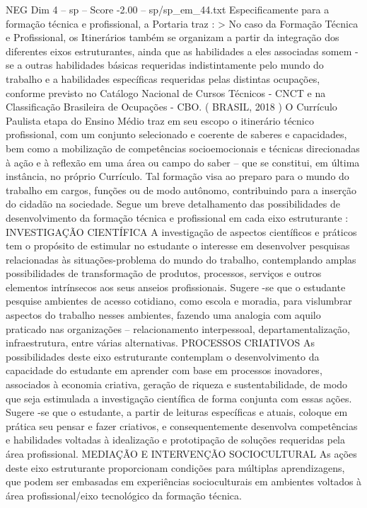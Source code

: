 \begin{textsample}{NEG Dim 4 – sp – Score -2.00 – sp/sp\_em\_44.txt}
Especificamente para a formação técnica e profissional, a Portaria traz : > No caso da Formação Técnica e Profissional, os Itinerários também se organizam a partir da integração dos diferentes eixos estruturantes, ainda que as habilidades a eles associadas somem -se a outras habilidades básicas requeridas indistintamente pelo mundo do trabalho e a habilidades específicas requeridas pelas distintas ocupações, conforme previsto no Catálogo Nacional de Cursos Técnicos - CNCT e na Classificação Brasileira de Ocupações - CBO. ( BRASIL, 2018 ) O Currículo Paulista etapa do Ensino Médio traz em seu escopo o itinerário técnico profissional, com um conjunto selecionado e coerente de saberes e capacidades, bem como a mobilização de competências socioemocionais e técnicas direcionadas à ação e à reflexão em uma área ou campo do saber – que se constitui, em última instância, no próprio Currículo.
Tal formação visa ao preparo para o mundo do trabalho em cargos, funções ou de modo autônomo, contribuindo para a inserção do cidadão na sociedade.
Segue um breve detalhamento das possibilidades de desenvolvimento da formação técnica e profissional em cada eixo estruturante : INVESTIGAÇÃO CIENTÍFICA A investigação de aspectos científicos e práticos tem o propósito de estimular no estudante o interesse em desenvolver pesquisas relacionadas às situações-problema do mundo do trabalho, contemplando amplas possibilidades de transformação de produtos, processos, serviços e outros elementos intrínsecos aos seus anseios profissionais.
Sugere -se que o estudante pesquise ambientes de acesso cotidiano, como escola e moradia, para vislumbrar aspectos do trabalho nesses ambientes, fazendo uma analogia com aquilo praticado nas organizações – relacionamento interpessoal, departamentalização, infraestrutura, entre várias alternativas.
PROCESSOS CRIATIVOS As possibilidades deste eixo estruturante contemplam o desenvolvimento da capacidade do estudante em aprender com base em processos inovadores, associados à economia criativa, geração de riqueza e sustentabilidade, de modo que seja estimulada a investigação científica de forma conjunta com essas ações.
Sugere -se que o estudante, a partir de leituras específicas e atuais, coloque em prática seu pensar e fazer criativos, e consequentemente desenvolva competências e habilidades voltadas à idealização e prototipação de soluções requeridas pela área profissional.
MEDIAÇÃO E INTERVENÇÃO SOCIOCULTURAL As ações deste eixo estruturante proporcionam condições para múltiplas aprendizagens, que podem ser embasadas em experiências socioculturais em ambientes voltados à área profissional/eixo tecnológico da formação técnica.

\end{textsample}
